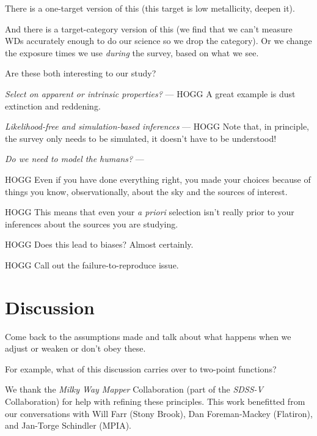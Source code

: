 \documentclass[modern]{aastex62}
\newcommand{\project}[1]{\textsl{#1}}
\newcommand{\foreign}[1]{\textsl{#1}}
\renewcommand{\paragraph}[1]{\medskip\noindent\textit{#1} ---}
\begin{document}
There is a one-target version of this (this target is low metallicity, deepen it).

And there is a target-category version of this (we find that we can't measure WDs
accurately enough to do our science so we drop the category). Or we change the exposure
times we use \emph{during} the survey, based on what we see.

Are these both interesting to our study?

\paragraph{Select on apparent or intrinsic properties?}
HOGG A great example is dust extinction and reddening.

\paragraph{Likelihood-free and simulation-based inferences}
HOGG Note that, in principle, the survey only needs to be simulated, it doesn't have
to be understood!

\paragraph{Do we need to model the humans?}

HOGG Even if you have done everything right, you made your choices because of things
you know, observationally, about the sky and the sources of interest.

HOGG This means that even your \foreign{a priori} selection isn't really prior to
your inferences about the sources you are studying.

HOGG Does this lead to biases? Almost certainly.

HOGG Call out the failure-to-reproduce issue.

\section{Discussion}

Come back to the assumptions made and talk about what happens when we
adjust or weaken or don't obey these.

For example, what of this discussion carries over to two-point functions?

\acknowledgements We thank the \project{Milky Way
  Mapper} Collaboration (part of the \project{SDSS-V} Collaboration)
for help with refining these principles.
This work benefitted from our conversations with
  Will Farr (Stony Brook),
  Dan Foreman-Mackey (Flatiron),
  and
  Jan-Torge Schindler (MPIA).
\end{document}
